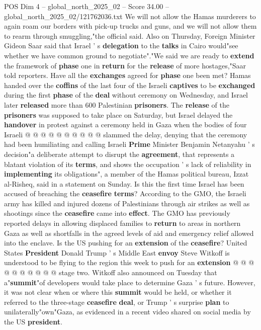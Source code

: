 \begin{textsample}{POS Dim 4 – global\_north\_2025\_02 – Score 34.00 – global\_north\_2025\_02/121762036.txt}
We will not allow the Hamas murderers to again roam our borders with pick-up trucks and guns, and we will not allow them to rearm through smuggling,"the official said.
Also on Thursday, Foreign Minister Gideon Saar said that Israel ' s \textbf{delegation} to the \textbf{talks} in Cairo would"see whether we have common ground to negotiate"."We said we are ready to \textbf{extend} the framework of \textbf{phase} one in \textbf{return} for the \textbf{release} of more hostages,"Saar told reporters.
Have all the \textbf{exchanges} agreed for \textbf{phase} one been met?
Hamas handed over the \textbf{coffins} of the last four of the Israeli \textbf{captives} to be \textbf{exchanged} during the first \textbf{phase} of the \textbf{deal} without ceremony on Wednesday, and Israel later \textbf{released} more than 600 Palestinian \textbf{prisoners}.
The \textbf{release} of the \textbf{prisoners} was supposed to take place on Saturday, but Israel delayed the \textbf{handover} in protest against a ceremony held in Gaza when the bodies of four Israeli @ @ @ @ @ @ @ @ @ @ slammed the delay, denying that the ceremony had been humiliating and calling Israeli \textbf{Prime} Minister Benjamin Netanyahu ' s decision"a deliberate attempt to disrupt the \textbf{agreement}, that represents a blatant violation of its \textbf{terms}, and shows the occupation ' s lack of reliability in \textbf{implementing} its obligations", a member of the Hamas political bureau, Izzat al-Risheq, said in a statement on Sunday.
Is this the first time Israel has been accused of breaching the \textbf{ceasefire} \textbf{terms}?
According to the GMO, the Israeli army has killed and injured dozens of Palestinians through air strikes as well as shootings since the \textbf{ceasefire} came into \textbf{effect}.
The GMO has previously reported delays in allowing displaced families to \textbf{return} to areas in northern Gaza as well as shortfalls in the agreed levels of aid and emergency relief allowed into the enclave.
Is the US pushing for an \textbf{extension} of the \textbf{ceasefire}?
United States \textbf{President} Donald Trump ' s Middle East \textbf{envoy} Steve Witkoff is understood to be flying to the region this week to push for an \textbf{extension} @ @ @ @ @ @ @ @ @ @ stage two.
Witkoff also announced on Tuesday that a"\textbf{summit}"of developers would take place to determine Gaza ' s future.
However, it was not clear when or where this \textbf{summit} would be held, or whether it referred to the three-stage \textbf{ceasefire} \textbf{deal}, or Trump ' s surprise \textbf{plan} to unilaterally"own"Gaza, as evidenced in a recent video shared on social media by the US \textbf{president}.

\end{textsample}
